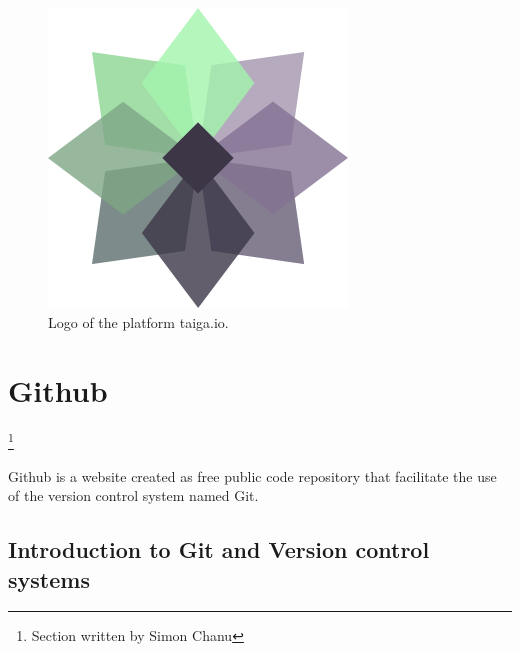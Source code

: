 \documentclass[a4paper]{report}
\begin{document}
\begin{figure}[H]
	\centering
	\includegraphics[width=0.6\linewidth]{image/taiga_io.png}
	\caption{Logo of the platform taiga.io.}
	\label{fig:taiga_logo}
\end{figure}

\section{Github}
\footnote{Section written by Simon Chanu}

Github is a website created as free public code repository that facilitate the use of the version control system named Git.

\subsection{Introduction to Git and Version control systems}
\end{document}
